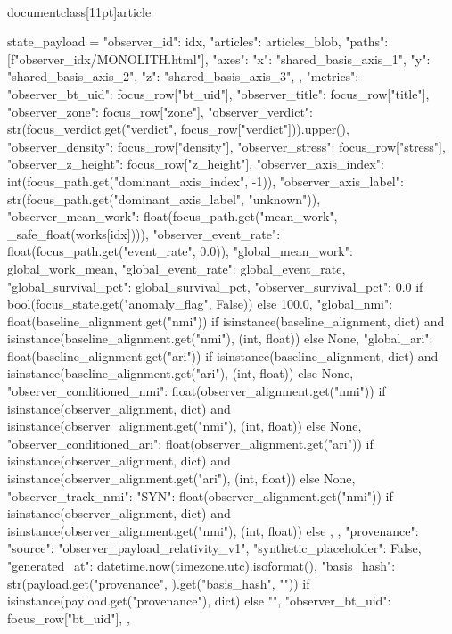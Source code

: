 \\documentclass[11pt]{article}
\begin{document}
\begin{CodeBlock}
        state_payload = {
            "observer_id": idx,
            "articles": articles_blob,
            "paths": [f"observer_{idx}/MONOLITH.html"],
            "axes": {
                "x": "shared_basis_axis_1",
                "y": "shared_basis_axis_2",
                "z": "shared_basis_axis_3",
            },
            "metrics": {
                "observer_bt_uid": focus_row["bt_uid"],
                "observer_title": focus_row["title"],
                "observer_zone": focus_row["zone"],
                "observer_verdict": str(focus_verdict.get("verdict", focus_row["verdict"])).upper(),
                "observer_density": focus_row["density"],
                "observer_stress": focus_row["stress"],
                "observer_z_height": focus_row["z_height"],
                "observer_axis_index": int(focus_path.get("dominant_axis_index", -1)),
                "observer_axis_label": str(focus_path.get("dominant_axis_label", "unknown")),
                "observer_mean_work": float(focus_path.get("mean_work", _safe_float(works[idx]))),
                "observer_event_rate": float(focus_path.get("event_rate", 0.0)),
                "global_mean_work": global_work_mean,
                "global_event_rate": global_event_rate,
                "global_survival_pct": global_survival_pct,
                "observer_survival_pct": 0.0 if bool(focus_state.get("anomaly_flag", False)) else 100.0,
                "global_nmi": float(baseline_alignment.get("nmi")) if isinstance(baseline_alignment, dict) and isinstance(baseline_alignment.get("nmi"), (int, float)) else None,
                "global_ari": float(baseline_alignment.get("ari")) if isinstance(baseline_alignment, dict) and isinstance(baseline_alignment.get("ari"), (int, float)) else None,
                "observer_conditioned_nmi": float(observer_alignment.get("nmi")) if isinstance(observer_alignment, dict) and isinstance(observer_alignment.get("nmi"), (int, float)) else None,
                "observer_conditioned_ari": float(observer_alignment.get("ari")) if isinstance(observer_alignment, dict) and isinstance(observer_alignment.get("ari"), (int, float)) else None,
                "observer_track_nmi": {"SYN": float(observer_alignment.get("nmi"))} if isinstance(observer_alignment, dict) and isinstance(observer_alignment.get("nmi"), (int, float)) else {},
            },
            "provenance": {
                "source": "observer_payload_relativity_v1",
                "synthetic_placeholder": False,
                "generated_at": datetime.now(timezone.utc).isoformat(),
                "basis_hash": str(payload.get("provenance", {}).get("basis_hash", "")) if isinstance(payload.get("provenance"), dict) else "",
                "observer_bt_uid": focus_row["bt_uid"],
            },
        }


\end{CodeBlock}
\end{document}
